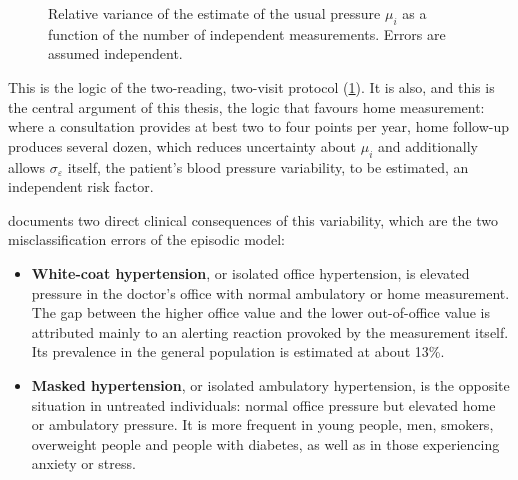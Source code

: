 \documentclass[12pt,a4paper,oneside]{report}
\begin{document}
\begin{figure}[htbp]
\centering
{}
\caption{Relative variance of the estimate of the usual pressure $\mu_i$ as a function of the number of independent measurements. Errors are assumed independent.}\label{fig:variance}
\end{figure}

This is the logic of the two-reading, two-visit protocol (\cref{fig:variance}). It is also, and this is the central argument of this thesis, the logic that favours home measurement: where a consultation provides at best two to four points per year, home follow-up produces several dozen, which reduces uncertainty about $\mu_i$ and additionally allows $\sigma_\varepsilon$ itself, the patient's blood pressure variability, to be estimated, an independent risk factor.

\textcite{navarro2023} documents two direct clinical consequences of this variability, which are the two misclassification errors of the episodic model:
\begin{itemize}[nosep]
  \item \textbf{White-coat hypertension}, or isolated office hypertension, is elevated pressure in the doctor's office with normal ambulatory or home measurement. The gap between the higher office value and the lower out-of-office value is attributed mainly to an alerting reaction provoked by the measurement itself. Its prevalence in the general population is estimated at about 13\%.
  \item \textbf{Masked hypertension}, or isolated ambulatory hypertension, is the opposite situation in untreated individuals: normal office pressure but elevated home or ambulatory pressure. It is more frequent in young people, men, smokers, overweight people and people with diabetes, as well as in those experiencing anxiety or stress.
\end{itemize}
\end{document}
